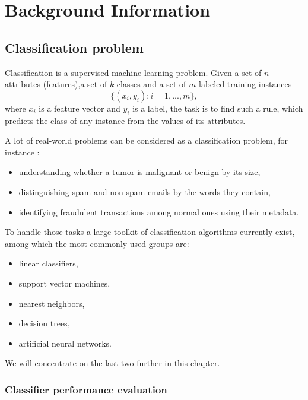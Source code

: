 \chapter{Background Information}
\label{ch:background-information}

\section{Classification problem}
Classification is a supervised machine learning problem. Given a set of $n$ attributes (features),a set of $k$ classes and a set of $m$ labeled training instances $$\{(x_i,y_i);i=1,...,m\},$$ where $x_i$ is a feature vector and $y_i$  is a label, the task is to find such a rule, which predicts the class of any instance from the values of its attributes.

A lot of real-world problems can be considered as a classification problem, for instance \citep{Ng-2012cs229}:
\begin{itemize}
    \item understanding whether a tumor is malignant or benign by its size,
    \item distinguishing spam and non-spam emails by the words they contain,
    \item identifying fraudulent transactions among normal ones using their metadata.
\end{itemize}
To handle those tasks a large toolkit of classification algorithms currently exist, among which the most commonly used groups are: 
\begin{itemize}
 \item linear classifiers,
 \item support vector machines,
 \item nearest neighbors,
 \item decision trees,
 \item artificial neural networks.
\end{itemize} 

We will concentrate on the last two further in this chapter.

\subsection{Classifier performance evaluation}

